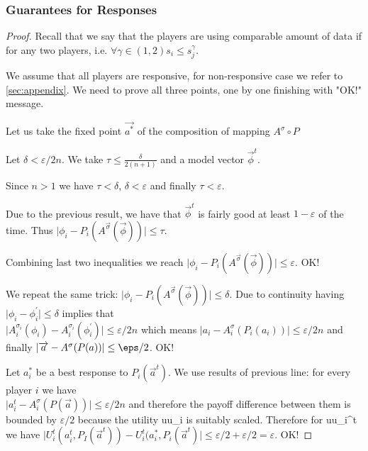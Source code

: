 \documentclass[]{spie}  %
\begin{document}
\subsubsection{Guarantees for Responses}
\label{sec:proofguarantees}
\begin{proof}
Recall that we say that the players are using comparable amount of data if for any two players, i.e. $\forall \gamma \in (1,2) s_i \leq s_j^\gamma$.

We assume that all players are responsive, for non-responsive case we refer to \autoref{sec:appendix}. We need to prove all three points, one by one finishing with "OK!" message.

Let us take the fixed point $\overrightarrow{a^*}$ of the composition of mapping $A^{\sigma} \circ P$

Let $\delta < \varepsilon/2n$. We take $\tau \leq \frac{\delta}{2(n+1)}$ and a model vector $\overrightarrow{\phi}^t$.

Since $n > 1$ we have $\tau < \delta$, $\delta < \varepsilon$ and finally $\tau < \varepsilon$.

Due to the previous result, we have that $\overrightarrow{\phi}^t$ is fairly good at least $1-\varepsilon$ of the time. Thus $ \lvert \phi_i - P_i(A^{\overrightarrow{\sigma}}(\overrightarrow{\phi})) \rvert \leq \tau$.

Combining last two inequalities we reach $ \lvert \phi_i - P_i(A^{\overrightarrow{\sigma}}(\overrightarrow{\phi})) \rvert \leq \varepsilon$. OK!

We repeat the same trick: $ \lvert \phi_i - P_i(A^{\overrightarrow{\sigma}}(\overrightarrow{\phi})) \rvert \leq \delta$. Due to continuity having $\lvert \phi_i - \phi_i^{'} \rvert \leq \delta$ implies that\\ $\lvert A_i^{\sigma_i}(\phi_i) - A_i^{\sigma_i}(\phi_i^{'}) \rvert \leq \varepsilon/2n$ which means $ \lvert a_i - A_i^{\sigma}(P_i(a_i)) \rvert \leq \varepsilon/2n $ and finally $\lvert \overrightarrow{a} - A^{\sigma}(P(a)) \rvert \leq \eps/2$. OK!

Let $a_i^*$ be a best response to $P_i(\overrightarrow{a}^t)$. We use results of previous line: for every player $i$ we have\\ $ \lvert a_i^t - A_i^{\sigma}(P(\overrightarrow{a})) \rvert \leq \varepsilon/2n $ and therefore the payoff difference between them is bounded by $\varepsilon/2$ because the utility \gls{uu_i} is suitably scaled. Therefore for \gls{uu_i^t} we have $\lvert U_i^t(a_i^t, P_I(\overrightarrow{a}^t)) - U_i^t(a_i^*, P_i(\overrightarrow{a}^t) \rvert \leq \varepsilon/2 + \varepsilon/2 = \varepsilon$. OK!
\end{proof}
\end{document}
